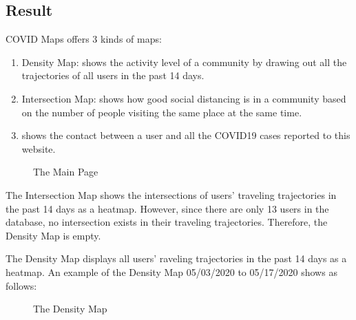 \documentclass{ucsdreport}
\begin{document}
\subsection{Result}
COVID Maps offers 3 kinds of maps:
\begin{enumerate}
    \item Density Map: shows the activity level of a community by drawing out 
    all the trajectories of all users in the past 14 days.
    \item Intersection Map: shows how good social distancing is in a community
    based on the number of people visiting the same place at the same time.
    \item shows the contact between a user and all the COVID19 cases reported to
    this website.
\end{enumerate}
\begin{figure}[H]
    \centering
    \caption{The Main Page}
\end{figure}

The Intersection Map shows the intersections of users' traveling trajectories 
in the past 14 days as a heatmap. However, since there are only 13 users in the 
database, no intersection exists in their traveling trajectories. Therefore, the 
Density Map is empty. 

The Density Map displays all users' raveling trajectories in the past 14 days 
as a heatmap. An example of the Density Map 05/03/2020 to 05/17/2020 shows as 
follows:

\begin{figure}[H]
    \centering
    \caption{The Density Map}
\end{figure}
\end{document}
